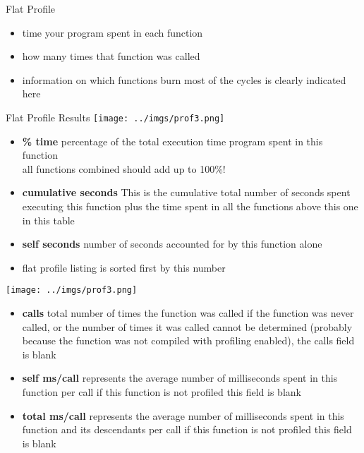 \documentclass{beamer}
\begin{document}
\begin{frame}{Flat Profile}
\begin{itemize}
\item time your program spent in each function
\item how many times that function was called 
\item information on which functions burn most of the cycles is clearly indicated here
\end{itemize}
\end{frame}

\begin{frame}{Flat Profile Results}
\texttt{[image: ../imgs/prof3.png]}
\begin{itemize}
\item \textbf{\% time} percentage of the total execution time program spent in this function \\
all functions combined should add up to 100\%!
\item \textbf{cumulative seconds}
This is the cumulative total number of seconds  spent executing this function plus the time spent in all the functions above this one in this table
\item \textbf{self seconds}
number of seconds accounted for by this function alone  
\item flat profile listing is sorted first by this number
\end{itemize}
\end{frame}

\begin{frame}{}
\texttt{[image: ../imgs/prof3.png]}
\begin{itemize}
\item \textbf{calls}
total number of times the function was called 
if the function was never called, or the number of times it was called cannot be determined (probably because the function was not compiled with profiling enabled), the calls field is blank

\item \textbf{self ms/call}
represents the average number of milliseconds spent in this function per call
if this function is not profiled this field is blank 

\item \textbf{total ms/call}
represents the average number of milliseconds spent in this function and its descendants per call
if this function is not profiled this field is blank
\end{itemize}
\end{frame}
\end{document}
